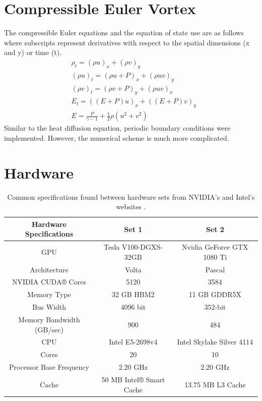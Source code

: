 \documentclass[review]{elsarticle}
\def\oldCPU{s}
\def\oldGPU{s}
\def\newCPU{s}
\def\newGPU{s}
\def\oldCPU{Intel Skylake Silver 4114} %
\def\oldGPU{Nvidia GeForce GTX 1080 Ti}
\def\newCPU{Intel E5-2698v4} %
\def\newGPU{Tesla V100-DGXS-32GB}
\begin{document}
\section{Compressible Euler Vortex}
\label{Compressible-Euler}
The compressible Euler equations and the equation of state use are as follows where subscripts represent derivatives with respect to the spatial dimensions (x and y) or time (t).
\begin{align*}
    &\rho_t  = (\rho u)_x + (\rho v)_y \\ 
    &(\rho u)_t  = (\rho u+P)_x + (\rho u v)_y\\
    &(\rho v)_t  = (\rho v+P)_y + (\rho u v)_x\\
    &E_t = ((E+P)u)_x+((E+P)v)_y\\
    &E = \frac{P}{\gamma -1}+\frac{1}{2}\rho(u^2+v^2)
\end{align*}
Similar to the heat diffusion equation, periodic boundary conditions were implemented. However, the numerical scheme is much more complicated.




\section{Hardware}
\label{Hardware}
\begin{table}[htb!]
\begin{center}
\begin{tabular}{ |c|c|c| } 

 \hline
 Hardware Specifications & Set 1 & Set 2 \\
 \hline
 GPU & \newGPU{} & \oldGPU{} \\
 Architecture   & Volta &  Pascal \\
 NVIDIA CUDA® Cores  & 5120 &  3584 \\
 Memory Type   & 32 GB HBM2 &  11 GB GDDR5X \\
 Bus Width    & 4096 bit &  352-bit \\
 Memory Bandwidth (GB/sec)  & 900 &  484 \\ 
 \hline
 CPU & \newCPU{} & \oldCPU{} \\ 
 Cores & 20 & 10 \\
 Processor Base Frequency & 2.20 GHz & 2.20 GHz \\
 Cache & 50 MB Intel® Smart Cache & 13.75 MB L3 Cache\\
 \hline
\end{tabular}
\end{center}
\caption{\label{hardwareTable} Common specifications found between hardware sets from NVIDIA's and Intel's websites \cite{Intel123550,Intel91753,NVIDIANVIDIA,GeForceGeForce}.}
\end{table}
\end{document}
